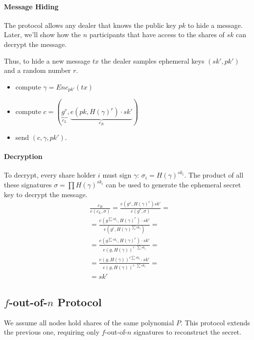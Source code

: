 \paragraph{Message Hiding}
The protocol allows any dealer that knows the public key $pk$ to hide a message. Later, we'll show how the $n$ participants that have access to the shares of $sk$ can decrypt the message. 

Thus, to hide a new message $tx$ the dealer samples ephemeral keys $\left(sk',pk'\right)$ and a random number $r$.
\begin{itemize}
\item compute \(\gamma=Enc_{pk'}\left(tx\right)\)
\item compute \(c=\left(\underbrace{g^{r}}_{c_{L}},\underbrace{e\left(pk,H\left(\gamma\right)^{r}\right)\cdot sk'}_{c_{R}}\right)\) 
\item send \(\left(c,\gamma,pk'\right)\).
\end{itemize}

\paragraph{Decryption}
To decrypt, every share holder $i$ must sign $\gamma$: \(\sigma_{i}=H\left(\gamma\right)^{sk_{i}}\).
The product of all these signatures \(\sigma=\prod H\left(\gamma\right)^{sk_{i}}\) can be used to generate the ephemeral secret key to decrypt the message.
\begin{align*}
 & \frac{c_{R}}{e\left(c_{L},\sigma\right)}=\frac{e\left(g^{x},H\left(\gamma\right)^{r}\right)sk'}{e\left(g^{r},\sigma\right)}=\\
 & =\frac{e\left(g^{\sum sk_{i}},H\left(\gamma\right)^{r}\right)\cdot sk'}{e\left(g^{r},H\left(\gamma\right)^{\sum sk_{i}}\right)}=\\
 & =\frac{e\left(g^{\sum sk_{i}},H\left(\gamma\right)^{r}\right)\cdot sk'}{e\left(g,H\left(\gamma\right)\right)^{r\cdot\sum sk_{i}}}=\\
 & =\frac{e\left(g,H\left(\gamma\right)\right)^{r\sum sk_{i}}\cdot sk'}{e\left(g,H\left(\gamma\right)\right)^{r\cdot\sum sk_{i}}}=\\
 & =sk'
\end{align*}


\subsection{\texorpdfstring{$f$-out-of-$n$}{f-out-of-n} Protocol}
We assume all nodes hold shares of the same polynomial $P$.
This protocol extends the previous one, requiring only $f$-out-of-$n$ signatures to reconstruct the secret.

